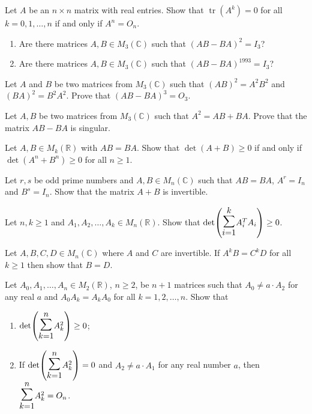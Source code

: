 \documentclass[12pt]{article}
\let\oldsum\sum
\renewcommand{\sum}{\mathlarger{\mathlarger{\oldsum}}}
\begin{document}
\begin{problem}
Let $A$ be an $n\times n$ matrix with real entries. Show that $\operatorname{tr}(A^k)=0$ for all $k=0,1,\dots,n$ if and only if $A^n=O_n$.
\end{problem}

\begin{problem}
\begin{enumerate}[label=(\alph*)]
\item Are there matrices $A,B\in M_3(\mathbb{C})$ such that $(AB-BA)^2=I_3$?
\item Are there matrices $A,B\in M_3(\mathbb{C})$ such that $(AB-BA)^{1993}=I_3$?
\end{enumerate}
\end{problem}

\begin{problem}
Let $A$ and $B$ be two matrices from $M_3(\mathbb{C})$ such that $(AB)^2=A^2B^2$ and $(BA)^2=B^2A^2$. Prove that $(AB-BA)^3=O_3$.
\end{problem}

\begin{problem}
Let $A,B$ be two matrices from $M_3(\mathbb{C})$ such that $A^2=AB+BA$. Prove that the matrix $AB-BA$ is singular.
\end{problem}

\begin{problem}
Let $A,B\in M_k(\mathbb{R})$ with $AB=BA$. Show that $\det(A+B)\ge 0$ if and only if $\det(A^n+B^n)\ge 0$ for all $n\ge 1$.
\end{problem}

\begin{problem}
Let $r,s$ be odd prime numbers and $A,B\in M_n(\mathbb{C})$ such that $AB=BA$, $A^r=I_n$ and $B^s=I_n$. Show that the matrix $A+B$ is invertible.
\end{problem}

\begin{problem}
Let $n,k\ge 1$ and $A_1,A_2,\dots,A_k\in M_n(\mathbb{R})$. Show that $\det\!\left(\sum_{i=1}^k A_i^TA_i\right)\ge 0$.
\end{problem}

\begin{problem}
Let $A,B,C,D\in M_n(\mathbb{C})$ where $A$ and $C$ are invertible. If $A^kB=C^kD$ for all $k\ge 1$ then show that $B=D$.
\end{problem}

\begin{problem}
Let $A_0,A_1,\dots,A_n\in M_2(\mathbb{R})$, $n\ge 2$, be $n+1$ matrices such that $A_0\ne a\cdot A_2$ for any real $a$ and $A_0A_k=A_kA_0$ for all $k=1,2,\dots,n$. Show that
\begin{enumerate}[label=(\alph*)]
\item $\det\!\left(\sum_{k=1}^n A_k^2\right) \ge 0$;
\item If $\det\!\left(\sum_{k=1}^n A_k^2\right)=0$ and $A_2\ne a\cdot A_1$ for any real number $a$, then $\sum_{k=1}^n A_k^2 = O_n$.
\end{enumerate}
\end{problem}
\end{document}
